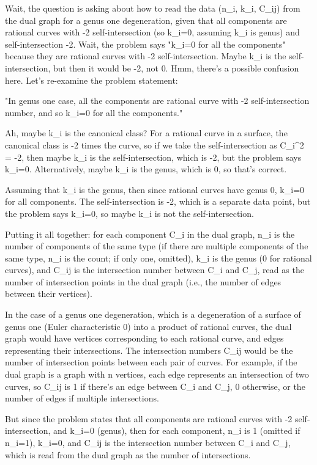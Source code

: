 Wait, the question is asking about how to read the data (n_i, k_i, C_ij) from the dual graph for a genus one degeneration, given that all components are rational curves with -2 self-intersection (so k_i=0, assuming k_i is genus) and self-intersection -2. Wait, the problem says "k_i=0 for all the components" because they are rational curves with -2 self-intersection. Maybe k_i is the self-intersection, but then it would be -2, not 0. Hmm, there's a possible confusion here. Let's re-examine the problem statement:

"In genus one case, all the components are rational curve with -2 self-intersection number, and so k_i=0 for all the components."

Ah, maybe k_i is the canonical class? For a rational curve in a surface, the canonical class is -2 times the curve, so if we take the self-intersection as C_i^2 = -2, then maybe k_i is the self-intersection, which is -2, but the problem says k_i=0. Alternatively, maybe k_i is the genus, which is 0, so that's correct. 

Assuming that k_i is the genus, then since rational curves have genus 0, k_i=0 for all components. The self-intersection is -2, which is a separate data point, but the problem says k_i=0, so maybe k_i is not the self-intersection. 

Putting it all together: for each component C_i in the dual graph, n_i is the number of components of the same type (if there are multiple components of the same type, n_i is the count; if only one, omitted), k_i is the genus (0 for rational curves), and C_ij is the intersection number between C_i and C_j, read as the number of intersection points in the dual graph (i.e., the number of edges between their vertices). 

In the case of a genus one degeneration, which is a degeneration of a surface of genus one (Euler characteristic 0) into a product of rational curves, the dual graph would have vertices corresponding to each rational curve, and edges representing their intersections. The intersection numbers C_ij would be the number of intersection points between each pair of curves. For example, if the dual graph is a graph with n vertices, each edge represents an intersection of two curves, so C_ij is 1 if there's an edge between C_i and C_j, 0 otherwise, or the number of edges if multiple intersections. 

But since the problem states that all components are rational curves with -2 self-intersection, and k_i=0 (genus), then for each component, n_i is 1 (omitted if n_i=1), k_i=0, and C_ij is the intersection number between C_i and C_j, which is read from the dual graph as the number of intersections. 

